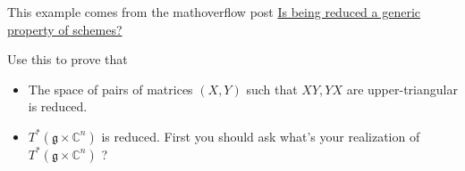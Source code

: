 \documentclass[../main.tex]{subfiles}
\begin{document}
\begin{example}
\end{example}

\begin{remark}
This example comes from the mathoverflow post \href{https://mathoverflow.net/questions/194296/is-being-reduced-a-generic-property-of-schemes/194299}{Is being reduced a generic property of schemes?}
\end{remark}
\begin{remark}
Use this to prove that
\begin{itemize}
\item The space of pairs of matrices $(X,Y)$ such that $XY, YX$ are upper-triangular is reduced.
\item $T^{*}(\mathfrak{g}\times \mathbb{C}^{n})$ is reduced. First you should ask what's your realization of $T^{*}(\mathfrak{g}\times \mathbb{C}^{n})$ ?
\end{itemize}
\end{remark}
\end{document}
